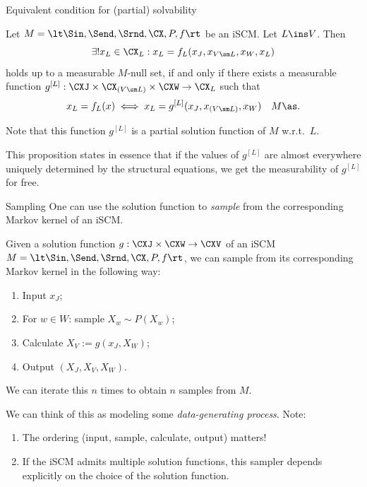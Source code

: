 \begin{frame}{Equivalent condition for (partial) solvability}
  \begin{Prp}[\ref{prp:scm_partial_solvability}]
  Let $M = \lt \Sin, \Send, \Srnd, \CX, P, f \rt$ be an iSCM.
  Let $L \ins V$.  
  Then
  $$\exists! x_L \in \CX_L : x_L = f_L(x_J,x_{V\sm L},x_W,x_L)$$
  holds up to a measurable $M$-null set, if and only if there exists a measurable function $g^{[L]}: \CXJ \times \CX_{(V\sm L)} \times \CXW \to \CX_L$ such that
    $$x_L = f_L(x) \iff x_L = g^{[L]}(x_J,x_{(V\sm L)},x_W)\quad M\as.$$
  \end{Prp}
  Note that this function $g^{[L]}$ is a partial solution function of $M$ w.r.t.\ $L$.

  \bigskip
  This proposition states in essence that if the values of $g^{[L]}$ are almost everywhere uniquely determined by the structural equations, we get the measurability of $g^{[L]}$ for free.
\end{frame}

\begin{frame}{Sampling}
  One can use the solution function to \emph{sample} from the corresponding Markov kernel of an iSCM. 
  \begin{Rem}[\ref{rem:sampling_from_scm}]
  Given a solution function $g : \CXJ \times \CXW \to \CXV$ of an iSCM $M = \lt \Sin, \Send, \Srnd, \CX, P, f \rt$,
  we can sample from its corresponding Markov kernel in the following way:
  \begin{enumerate}
    \item Input $x_J$;
    \item For $w \in W$: sample $X_w \sim P(X_w)$;
    \item Calculate $X_{V} := g(x_J,X_W)$;
    \item Output $(X_J,X_V,X_W)$.
  \end{enumerate}
  We can iterate this $n$ times to obtain $n$ samples from $M$.
\end{Rem}
We can think of this as modeling some \emph{data-generating process}. Note:
  \begin{enumerate}
    \item The ordering (input, sample, calculate, output) matters!
    \item If the iSCM admits multiple solution functions, this sampler depends explicitly on the choice of the solution function.
  \end{enumerate}      
\end{frame}

